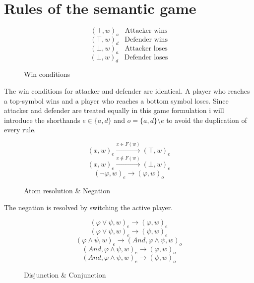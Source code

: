 \documentclass[a4paper,american]{paper}
\begin{document}
\section*{Rules of the semantic game}
\begin{figure}[H]
	\centering
	\begin{equation}
		(\top ,w)_{a}\hspace{10pt}\text{Attacker wins}
	\end{equation}
	\begin{equation}
		(\top ,w)_{d}\hspace{10pt}\text{Defender wins}
	\end{equation}
	\begin{equation}
		(\bot ,w)_{a}\hspace{10pt}\text{Attacker loses}
	\end{equation}
	\begin{equation}
		(\bot ,w)_{d}\hspace{10pt}\text{Defender loses}
	\end{equation}
	\caption{Win conditions}
	\label{fig:win_rules}
\end{figure}
	The win conditions for attacker and defender are identical.
	A player who reaches a top-symbol wins and a player who reaches a bottom symbol loses.
	Since attacker and defender are treated equally in this game formulation i will introduce the shorthands $e\in\{ a, d\}$ and $o = \{ a, d\}\setminus{}e$ to avoid the duplication of every rule.
\begin{figure}[H]
	\centering
	\begin{equation}
		(x,w)_{e}\xrightarrow{x\in F(w)}(\top ,w)_{e}
	\end{equation}
	\begin{equation}
		(x,w)_{e}\xrightarrow{x\not\in F(w)}(\bot ,w)_{e}
	\end{equation}
	\begin{equation}
		(\neg\varphi ,w)_{e}\rightarrow (\varphi ,w)_{o}
	\end{equation}
	\caption{Atom resolution \& Negation}
	\label{fig:neg_rules}
\end{figure}
	The negation is resolved by switching the active player.
\begin{figure}[H]
	\centering
	\begin{equation}
		(\varphi\vee\psi ,w)_e\rightarrow (\varphi ,w)_{e}
	\end{equation}
	\begin{equation}
		(\varphi\vee\psi ,w)_e\rightarrow (\psi ,w)_{e}
	\end{equation}
	\begin{equation}
		(\varphi\wedge\psi ,w)_e\rightarrow (And, \varphi\wedge\psi ,w)_{o}
	\end{equation}
	\begin{equation}
		(And, \varphi\wedge\psi ,w)_e\rightarrow (\varphi ,w)_{o}
	\end{equation}
	\begin{equation}
		(And, \varphi\wedge\psi ,w)_e\rightarrow (\psi ,w)_{o}
	\end{equation}
	\caption{Disjunction \& Conjunction}
	\label{fig:neg_rules}
\end{figure}
\end{document}
